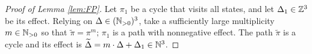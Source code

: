 \begin{proof}[Proof of Lemma \ref{lem:FP}]
Let $\pi_1$ be a cycle that visits all states, and
let $\Delta_1\in\mathbb{Z}^3$ be its effect.
%
%
%
Relying on $\Delta\in(\mathbb{N}_{>0})^3$,
take a sufficiently large multiplicity $m\in\mathbb{N}_{>0}$ so that 
$\widetilde \pi = \pi^m;\, \pi_1$ is a path with nonnegative effect.
The path $\widetilde \pi$ is a cycle and  its effect is
$\widetilde \Delta = m\cdot\Delta + \Delta_1 \in \mathbb{N}^3$.


\end{proof}
